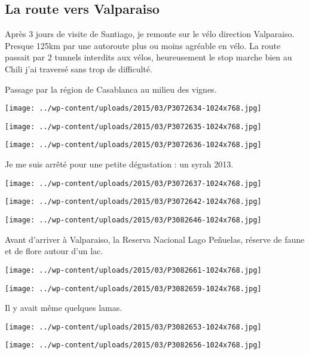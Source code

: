 \subsection*{La route vers Valparaiso}

 Après 3 jours de visite de Santiago, je remonte sur le vélo direction Valparaiso. Presque 125km par une autoroute plus ou moins agréable en vélo. La route passait par 2 tunnels interdits aux vélos, heureusement le stop marche bien au Chili j'ai traversé sans trop de difficulté. 

 Passage par la région de Casablanca au milieu des vignes. 
\begin{center} \texttt{[image: ../wp-content/uploads/2015/03/P3072634-1024x768.jpg]} \end{center}
\begin{center} \texttt{[image: ../wp-content/uploads/2015/03/P3072635-1024x768.jpg]} \end{center}
\begin{center} \texttt{[image: ../wp-content/uploads/2015/03/P3072636-1024x768.jpg]} \end{center}

  Je me suis arrêté pour une petite dégustation : un syrah 2013.
\begin{center} \texttt{[image: ../wp-content/uploads/2015/03/P3072637-1024x768.jpg]} \end{center}
\begin{center} \texttt{[image: ../wp-content/uploads/2015/03/P3072642-1024x768.jpg]} \end{center}
\vfill
\begin{center} \texttt{[image: ../wp-content/uploads/2015/03/P3082646-1024x768.jpg]} \end{center}
\vspace{-\topsep}
\vspace{-0.75mm}

\pagebreak
Avant d'arriver à Valparaiso, la Reserva Nacional Lago Peñuelas, réserve de faune et de flore autour d'un lac. 
\begin{center} \texttt{[image: ../wp-content/uploads/2015/03/P3082661-1024x768.jpg]} \end{center}
\begin{center} \texttt{[image: ../wp-content/uploads/2015/03/P3082659-1024x768.jpg]} \end{center}
\vspace{-\topsep}
\vspace{-3mm}

\pagebreak
 Il y avait même quelques lamas. \\
 \vfill
\begin{center} \texttt{[image: ../wp-content/uploads/2015/03/P3082653-1024x768.jpg]} \end{center}
\vfill
\begin{center} \texttt{[image: ../wp-content/uploads/2015/03/P3082656-1024x768.jpg]} \end{center}
\vspace{-\topsep}
\vspace{-0.75mm}
